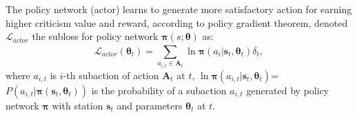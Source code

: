 \documentclass{ar2rc}
\begin{document}
The policy network (actor) learns to generate more satisfactory action for earning higher criticism value and reward, according to policy gradient theorem, denoted $\mathcal{L}_{actor}$ the subloss for policy network $\boldsymbol{\pi}\left(s;\boldsymbol{\theta}\right)$ as:
\begin{equation}
   \mathcal{L}_{actor}(\boldsymbol{\theta}_t) =  \sum^{}_{a_{i,t}\in\mathbf{A}_t}\ln\boldsymbol{\pi}\left(a_i|\boldsymbol{s}_t,\boldsymbol{\theta}_t \right)\delta_t, \tag{26}
\end{equation}
where $a_{i,t}$ is $i$-th subaction of action $\mathbf{A}_t$ at $t$, $\ln\boldsymbol{\pi}\left(a_{i,t}|\boldsymbol{s}_t,\boldsymbol{\theta}_t \right)$=$P(a_{i,t}|\boldsymbol{\pi}\left(\boldsymbol{s}_t,\boldsymbol{\theta}_t \right))$ is the probability of a subaction $a_{i,t}$ generated by policy network $\boldsymbol{\pi}$ with station $\boldsymbol{s}_t$ and parameters $\boldsymbol{\theta}_t$ at $t$. 
\end{document}
